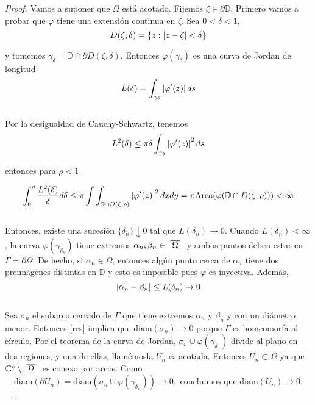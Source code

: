 \begin{proof}
    Vamos a suponer que $\Omega$ está acotado. Fijemos $\zeta \in \partial \mathbb{D}$. Primero vamos a probar que $\varphi$ tiene una extensión continua en $\zeta$. Sea $0 < \delta < 1$,
    \begin{equation*}
        D(\zeta, \delta) = \{z: \left\lvert z - \zeta\right\rvert < \delta \}
    \end{equation*}

    y tomemos $\gamma_{\delta} = \mathbb{D} \cap \partial D(\zeta, \delta)$. Entonces $\varphi (\gamma_{\delta})$ es una curva de Jordan de longitud
    \begin{equation*}
        L(\delta) = \int_{\gamma_{\delta}} \left\lvert\varphi ' (z)\right\rvert ds
    \end{equation*}
    \\
    Por la desigualdad de Cauchy-Schwartz, tenemos
    \begin{equation*}
        L^2(\delta) \leq \pi \delta \int_{\gamma_{\delta}} \left\lvert\varphi ' (z)\right\rvert^2 ds
    \end{equation*}

    entonces para $\rho < 1$

    \begin{equation*}
        \int_{0}^{\rho} \frac{L^2(\delta)}{\delta} d\delta \leq \pi \int \int_{\mathbb{D} \cap D(\zeta, \rho)} \left\lvert\varphi ' (z)\right\rvert^2 dxdy = \pi \text{Area}(\varphi(\mathbb{D} \cap D(\zeta, \rho))) < \infty
    \end{equation*}
    \\
    Entonces, existe una sucesión $\{ \delta_n\} \downarrow 0$ tal que $L(\delta_n) \rightarrow 0$. Cuando $L(\delta_n) < \infty$, la curva $\varphi(\gamma_{\delta_n})$ tiene extremos $\alpha_n, \beta_n \in \xbar{\Omega}$ y ambos puntos deben estar en $\Gamma = \partial \Omega$. De hecho, si $\alpha_n \in \Omega$, entonces algún punto cerca de $\alpha_n$ tiene dos preimágenes distintas en $\mathbb{D}$ y esto es imposible pues $\varphi$ es inyectiva. Además,
    \begin{equation}\label{res}
        \left\lvert\alpha_n - \beta_n\right\rvert \leq L(\delta_n) \rightarrow 0
    \end{equation}
    \\
    Sea $\sigma_n$ el subarco cerrado de $\Gamma$ que tiene extremos $\alpha_n$ y $\beta_n$ y con un diámetro menor. Entonces \ref{res} implica que $\text{diam}(\sigma_n) \rightarrow 0$ porque $\Gamma$ es homeomorfa al círculo. Por el teorema de la curva de Jordan, $\sigma_n \cup \varphi(\gamma_{\delta_n})$ divide al plano en dos regiones, y una de ellas, llamémosla $U_n$ es acotada. Entonces $U_n \subset \Omega$ ya que $\mathbb{C}^* \setminus \xbar{\Omega}$ es conexo por arcos. Como
    \begin{equation}
        \label{res2}
        \text{diam}(\partial U_n) = \text{diam}(\sigma_n \cup \varphi(\gamma_{\delta_n})) \rightarrow 0,
        \text{ concluimos que }
        \text{diam}(U_n) \rightarrow 0.
    \end{equation}


\end{proof}
